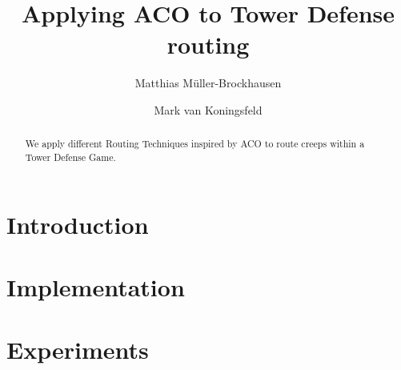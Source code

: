 \documentclass[runningheads,a4paper]{llncs}
\begin{document}
\mainmatter  %

\title{Applying ACO to Tower Defense routing}


%
%
\author{Matthias Müller-Brockhausen \and Mark van Koningsfeld}
%


%
%

\maketitle


\begin{abstract}
We apply different Routing Techniques inspired by ACO to route creeps within a Tower Defense Game.
\end{abstract}




\section{Introduction}
\label{sec:introduction}


\section{Implementation}
\label{sec:implementation}



\section{Experiments}
\label{sec:experiments}

\end{document}
